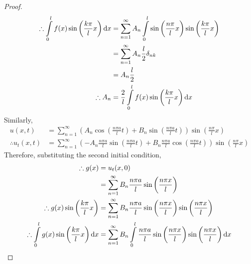 \documentclass[titlepage, fleqn, a4paper, 12pt, twoside]{article}
\theoremstyle{definition}
\theoremstyle{theorem}
\begin{document}
\begin{proof}
\begin{align*}
		\therefore \int\limits_{0}^{l} f(x) \sin\left( \frac{k \pi}{l} x \right) \dif x & = \sum\limits_{n = 1}^{\infty} A_n \int\limits_{0}^{l} \sin\left( \frac{n \pi}{l} x \right) \sin\left( \frac{k \pi}{l} x \right) \\
                                                                                                & = \sum\limits_{n = 1}^{\infty} A_n \frac{l}{2} \delta_{n k}                                                                      \\
                                                                                                & = A_n \frac{l}{2}                                                                                                                \\
		\therefore A_n                                                                  & = \frac{2}{l} \int\limits_{0}^{l} f(x) \sin\left( \frac{k \pi}{l} x \right) \dif x
	\end{align*}
	Similarly,
	\begin{align*}
		u(x,t)              & = \sum\limits_{n = 1}^{\infty} \left( A_n \cos\left( \frac{n \pi a}{l} t \right) + B_n \sin\left( \frac{n \pi a}{l} t \right) \right) \sin\left( \frac{n \pi}{l} x \right) \\
		\therefore u_t(x,t) & = \sum\limits_{n = 1}^{\infty} \left( -A_n \frac{n \pi a}{l} \sin\left( \frac{n \pi a}{l} t \right) + B_n \frac{n \pi a}{l} \cos\left( \frac{n \pi a}{l} t \right) \right) \sin\left( \frac{n \pi}{l} x \right)
	\end{align*}
	Therefore, substituting the second initial condition,
	\begin{align*}
		\therefore g(x)                                                                 & = u_t(x,0)                                                                                                                                                \\
                                                                                                & = \sum\limits_{n = 1}^{\infty} B_n \frac{n \pi a}{l} \sin\left( \frac{n \pi x}{l} \right)                                                                 \\
		\therefore g(x) \sin\left( \frac{k \pi}{l} x \right)                            & = \sum\limits_{n = 1}^{\infty} B_n \frac{n \pi a}{l} \sin\left( \frac{n \pi x}{l} \right) \sin\left( \frac{n \pi x}{l} \right)                            \\
		\therefore \int\limits_{0}^{l} g(x) \sin\left( \frac{k \pi}{l} x \right) \dif x & = \sum\limits_{n = 1}^{\infty} B_n \int\limits_{0}^{l} \frac{n \pi a}{l} \sin\left( \frac{n \pi x}{l} \right) \sin\left( \frac{n \pi x}{l} \right) \dif x \\

\end{align*}
\end{proof}
\end{document}
